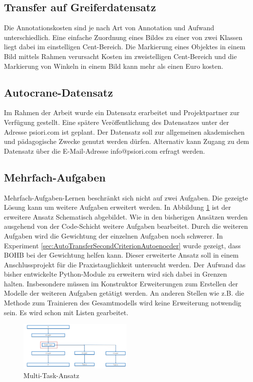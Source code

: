 	\subsection{Transfer auf Greiferdatensatz}
	\label{subsec:TransferGreiferDatensatz}
 	Die Annotationskosten sind je nach Art von Annotation und Aufwand unterschiedlich. Eine einfache Zuordnung eines Bildes zu einer von zwei Klassen liegt dabei im einstelligen Cent-Bereich. Die Markierung eines Objektes in einem Bild mittels Rahmen verursacht Kosten im zweistelligen Cent-Bereich und die Markierung von Winkeln in einem Bild kann mehr als einen Euro kosten. 		

	
	\subsection{Autocrane-Datensatz}
	\label{subsec:AutocraneDatensatz}	
	Im Rahmen der Arbeit wurde ein Datensatz erarbeitet und Projektpartner zur Verfügung gestellt. Eine spätere Veröffentlichung des Datensatzes unter der Adresse psiori.com ist geplant. Der Datensatz soll zur allgemeinen akademischen und pädagogische Zwecke genutzt werden dürfen. Alternativ kann Zugang zu dem Datensatz über die E-Mail-Adresse info@psiori.com erfragt werden.

	\subsection{Mehrfach-Aufgaben}
	\label{subsec:MehrfacheAufgaben}
	Mehrfach-Aufgaben-Lernen beschränkt sich nicht auf zwei Aufgaben. Die gezeigte Lösung kann um weitere Aufgaben erweitert werden. In Abbildung \ref{img:AusblickMultiTaskAnsatz} ist der erweitere Ansatz Schematisch abgebildet. Wie in den bisherigen Ansätzen werden ausgehend von der Code-Schicht weitere Aufgaben bearbeitet. Durch die weiteren Aufgaben wird die Gewichtung der einzelnen Aufgaben noch schwerer. In Experiment \ref{sec:AutoTransferSecondCriterionAutoenocder}  wurde gezeigt, dass BOHB bei der Gewichtung helfen kann. Dieser erweiterte Ansatz soll in einem Anschlussprojekt für die Praxistauglichkeit untersucht werden. Der Aufwand das bisher entwickelte Python-Module zu erweitern wird sich dabei in Grenzen halten. Insbesondere müssen im Konstruktor Erweiterungen zum Erstellen der Modelle der weiteren Aufgaben getätigt werden. An anderen Stellen wie z.B. die Methode zum Trainieren des Gesamtmodells wird keine Erweiterung notwendig sein. Es wird schon mit Listen gearbeitet.   
	\begin{figure}[h]
		\centering
		\includegraphics[width=0.5\textwidth, center]{bilder/FazitUndAusblick/MultiTaskAnsatz.PNG}
		\caption[Ausblick Multi-Task-Ansatz]{Multi-Task-Ansatz}
		\label{img:AusblickMultiTaskAnsatz}
	\end{figure}


